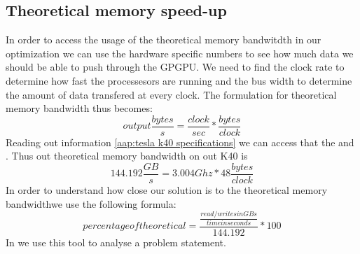 \subsection{Theoretical memory speed-up}
\label{sec:analysing hardware}
In order to access the usage of the theoretical memory bandwitdth in our optimization we can use the hardware specific numbers to see how much data we should be able to push through the GPGPU.
We need to find the clock rate to determine how fast the processesors are running and the bus width to determine the amount of data transfered at every clock.
The formulation for theoretical memory bandwidth thus becomes:
\begin{equation*}
output \frac{bytes}{s} = \frac{clock}{sec} * \frac{bytes}{clock}
\end{equation*}
Reading out  information \cref{aap:tesla k40 specifications} we can access that the  and .
Thus out theoretical memory bandwidth on out K40 is
\begin{equation*}
144.192 \frac{GB}{s} = 3.004 Ghz * 48 \frac{bytes}{clock}
\end{equation*}
In order to understand how close our solution is to the theoretical memory bandwidthwe use the following formula:
\begin{equation*}
percentage of theoretical = \frac{\frac{read/writes in GBs}{time in seconds}}{144.192} * 100
\end{equation*}
In  we use this tool to analyse a problem statement.


